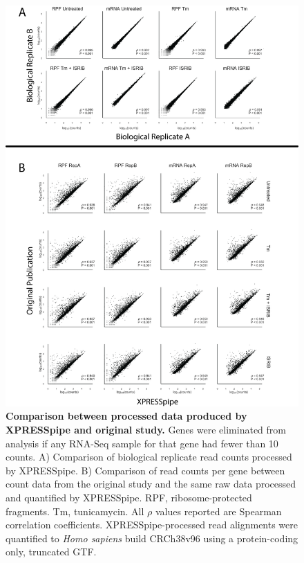 \documentclass[10pt, oneside]{article}
\begin{document}
\begin{multicols}{2}
\begin{figure}
\centering
  \includegraphics[width=145mm]{figures/xpresspipe_figure2.png}
  \caption{\textbf{Comparison between processed data produced by XPRESSpipe and original study.} Genes were eliminated from analysis if any RNA-Seq sample for that gene had fewer than 10 counts. A) Comparison of biological replicate read counts processed by XPRESSpipe. B) Comparison of read counts per gene between count data from the original study and the same raw data processed and quantified by XPRESSpipe. RPF, ribosome-protected fragments. Tm, tunicamycin. All $\rho$ values reported are Spearman correlation coefficients. XPRESSpipe-processed read alignments were quantified to \textit{Homo sapiens} build CRCh38v96 using a protein-coding only, truncated GTF.}
  \label{fig:figure2}
\end{figure}


\end{multicols}
\end{document}
